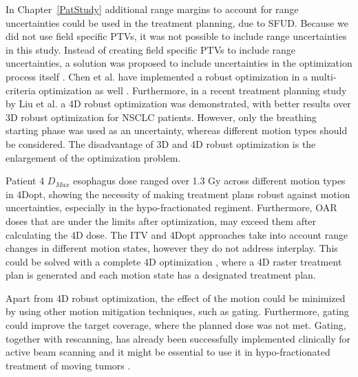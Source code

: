 In Chapter~\ref{PatStudy} additional range margins to account for range uncertainties could be used in the treatment planning, due to SFUD. 
Because we did not use field specific PTVs, it was not possible to include range uncertainties in this study.
Instead of creating field specific PTVs to include range uncertainties, a solution was proposed to include uncertainties in the optimization process itself \cite{Pflugfelder2008, Unkelbach2009, Fredriksson2011, Chen2012}.
Chen et al. have implemented a robust optimization in a multi-criteria optimization as well \cite{Chen2012}. Furthermore, in a recent treatment planning study by Liu et al. \cite{Liu2016}
a 4D robust optimization was demonstrated, with better results over 3D robust optimization for NSCLC patients. However, only the breathing starting phase was used as an uncertainty,
whereas different motion types should be considered. The disadvantage of 3D and 4D robust optimization is the enlargement of the optimization problem.

Patient 4 $D_{Max}$ esophagus dose ranged over 1.3 Gy across different motion types in 4Dopt, showing the necessity of making treatment plans robust against motion uncertainties, 
especially in the hypo-fractionated regiment. Furthermore, OAR doses that are under the limits after optimization, may exceed them after calculating the 4D dose. 
The ITV and 4Dopt approaches take into account range changes in different motion states, however they do not address interplay. 
This could be solved with a complete 4D optimization \cite{Graeff2013}, where a 4D raster treatment plan is 
generated and each motion state has a designated treatment plan. 


Apart from 4D robust optimization, the effect of the motion could be minimized by using other motion mitigation techniques, such as gating. Furthermore, gating could improve the target coverage, where the planned dose was
not met. Gating, together with rescanning, has already been successfully implemented clinically for active beam scanning \cite{Rossi2016, Mori2016} and it might be essential to use it in hypo-fractionated 
treatment of moving tumors \cite{Richter2014}.

